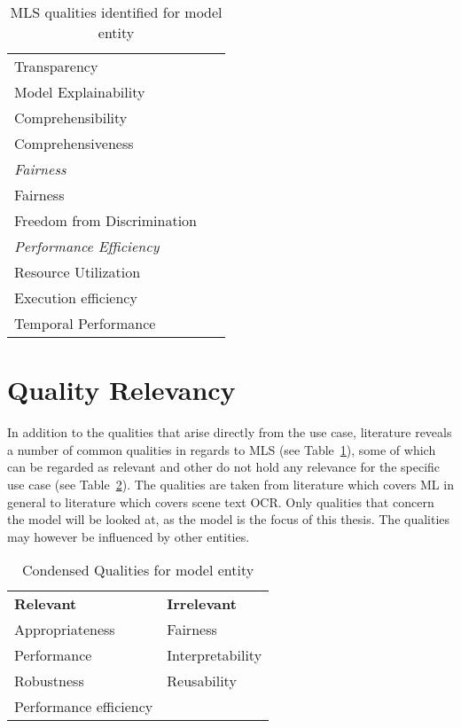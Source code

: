 \begin{table}[h]
\begin{tabular}{p{} p{}}
        Transparency &~\cite{arpteg_software_2018} \\
        Model Explainability &~\cite{vogelsang_requirements_2019} \\
        Comprehensibility &~\cite{ashmore_assuring_2021} \\
        Comprehensiveness &~\cite{ashmore_assuring_2021} \\
        \midrule
        \textit{Fairness}\\
        Fairness &~\cite{siebert_construction_2021, zhang_machine_2020} \\
        Freedom from Discrimination &~\cite{vogelsang_requirements_2019} \\
        \midrule
        \textit{Performance Efficiency} \\
        Resource Utilization &~\cite{siebert_construction_2021,
                                nakamichi_requirements-driven_2020} \\
        Execution efficiency &~\cite{siebert_construction_2021} \\
        Temporal Performance &~\cite{nakamichi_requirements-driven_2020} \\
        \bottomrule
    \end{tabular}
    \caption{MLS qualities identified for model entity\label{tb:LiteratureQualitiesModel}}
\end{table}
\FloatBarrier%

\section{Quality Relevancy}\label{se:relevant-qualities}
In addition to the qualities that arise directly from the use case, literature reveals a number of
common qualities in regards to \ac{MLS} (see Table~\ref{tb:LiteratureQualitiesModel}), some of which
can be regarded as relevant and other do not hold any relevance for the specific use case (see
Table~\ref{tb:condensedQualities}).
The qualities are taken from literature which covers \ac{ML} in general to literature
which covers scene text \ac{OCR}.
Only qualities that concern the model will be looked at, as the model is the focus of this thesis.
The qualities may however be influenced by other entities.

\begin{table}[h]
    \centering\scriptsize
    \begin{tabular}{l l}
        \textbf{Relevant}                & \textbf{Irrelevant} \\
        Appropriateness         & Fairness  \\
        Performance             & Interpretability \\
        Robustness              & Reusability \\
        Performance efficiency  & \\
    \end{tabular}
    \caption{Condensed Qualities for model entity\label{tb:condensedQualities}}
\end{table}

